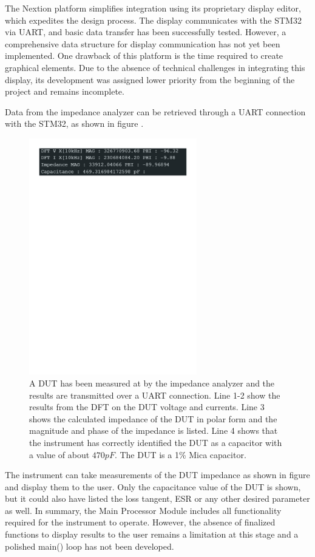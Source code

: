 The Nextion platform simplifies integration using its proprietary display editor, which expedites the design process. The display communicates with the STM32 via UART, and basic data transfer has been successfully tested. However, a comprehensive data structure for display communication has not yet been implemented. One drawback of this platform is the time required to create graphical elements. Due to the absence of technical challenges in integrating this display, its development was assigned lower priority from the beginning of the project and remains incomplete.

Data from the impedance analyzer can be retrieved through a UART connection with the STM32, as shown in figure .

\begin{figure}[H] \centering \includegraphics[clip, trim=0 700 0 0, width=0.65\textwidth]{Sections/7_SystemDesign/Figures/7_3_3_CapMeasuredSerialPrint.pdf} \caption{A DUT has been measured at  by the impedance analyzer and the results are transmitted over a UART connection. Line 1-2 show the results from the DFT on the DUT voltage and currents. Line 3 shows the calculated impedance of the DUT in polar form and the magnitude and phase of the impedance is listed. Line 4 shows that the instrument has correctly identified the DUT as a capacitor with a value of about $470pF$. The DUT is a  1\% Mica capacitor.} \label{fig:7_3_3_CapMeasSerialPrint} \end{figure}

The instrument can take measurements of the DUT impedance as shown in figure  and display them to the user. Only the capacitance value of the DUT is shown, but it could also have listed the loss tangent, ESR or any other desired parameter as well. In summary, the Main Processor Module includes all functionality required for the instrument to operate. However, the absence of finalized functions to display results to the user remains a limitation at this stage and a polished main() loop has not been developed.